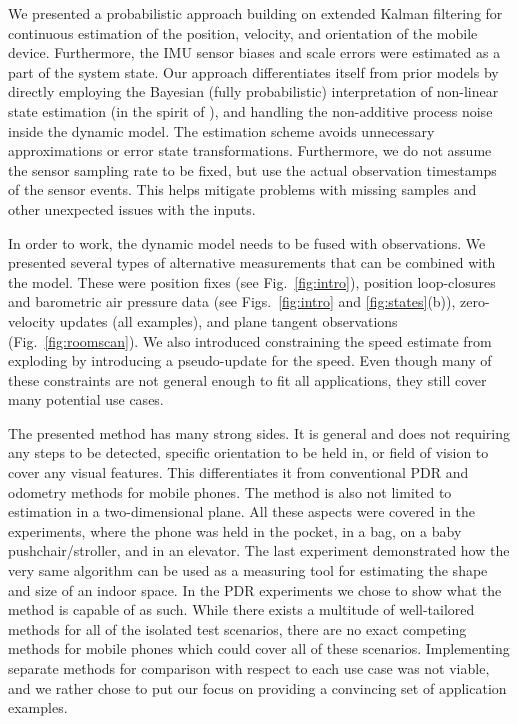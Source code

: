 \documentclass[conference]{ieeetran}
\begin{document}
We presented a probabilistic approach building on extended Kalman filtering for continuous estimation of the position, velocity, and orientation of the mobile device. Furthermore, the IMU sensor biases and scale errors were estimated as a part of the system state. Our approach differentiates itself from prior models by directly employing the Bayesian (fully probabilistic) interpretation of non-linear state estimation (in the spirit of \cite{Sarkka:2013}), and handling the non-additive process noise inside the dynamic model. The estimation scheme avoids unnecessary approximations or error state transformations. Furthermore, we do not assume the sensor sampling rate to be fixed, but use the actual observation timestamps of the sensor events. This helps mitigate problems with missing samples and other unexpected issues with the inputs.

In order to work, the dynamic model needs to be fused with observations. We presented several types of alternative measurements that can be combined with the model. These were position fixes (see Fig.~\ref{fig:intro}), position loop-closures and barometric air pressure data (see Figs.~\ref{fig:intro} and \ref{fig:states}(b)), zero-velocity updates (all examples), and plane tangent observations (Fig.~\ref{fig:roomscan}). We also introduced constraining the speed estimate from exploding by introducing a pseudo-update for the speed. Even though many of these constraints are not general enough to fit  all applications, they still cover many potential use cases.

The presented method has many strong sides. It is general and does not requiring any steps to be detected, specific orientation to be held in, or field of vision to cover any visual features. This differentiates it from conventional PDR and odometry methods for mobile phones. The method is also not limited to estimation in a two-dimensional plane. All these aspects were covered in the experiments, where the phone was held in the pocket, in a bag, on a baby pushchair/stroller, and in an elevator. The last experiment demonstrated how the very same algorithm can be used as a measuring tool for estimating the shape and size of an indoor space.
In the PDR experiments we chose to show what the method is capable of as such. While there exists a multitude of well-tailored methods for all of the isolated test scenarios, there are no exact competing methods for mobile phones which could cover all of these scenarios. Implementing separate methods for comparison with respect to each use case was not viable, and we rather chose to put our focus on providing a convincing set of application examples.
\end{document}
